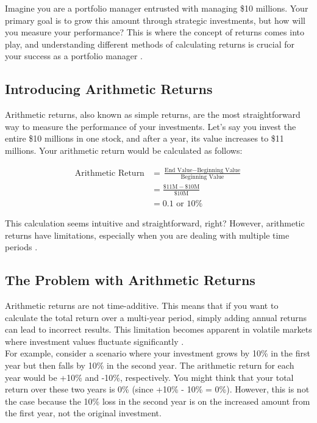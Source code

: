 \documentclass{article}
\begin{document}
Imagine you are a portfolio manager entrusted with managing \$10 millions. Your primary goal is to grow this amount through strategic investments, but how will you measure your performance? This is where the concept of returns comes into play, and understanding different methods of calculating returns is crucial for your success as a portfolio manager \cite{bodie2018investments}.

\subsection{Introducing Arithmetic Returns}

Arithmetic returns, also known as simple returns, are the most straightforward way to measure the performance of your investments. Let's say you invest the entire \$10 millions in one stock, and after a year, its value increases to \$11 millions. Your arithmetic return would be calculated as follows:

\begin{align*}
    \text{Arithmetic Return} &= \frac{\text{End Value} - \text{Beginning Value}}{\text{Beginning Value}} \\
                             &= \frac{\$11\text{M} - \$10\text{M}}{\$10\text{M}} \\
                             &= 0.1 \text{ or } 10\%
\end{align*}

This calculation seems intuitive and straightforward, right? However, arithmetic returns have limitations, especially when you are dealing with multiple time periods \cite{fabozzi2010foundations}.

\subsection{The Problem with Arithmetic Returns}

Arithmetic returns are not time-additive. This means that if you want to calculate the total return over a multi-year period, simply adding annual returns can lead to incorrect results. This limitation becomes apparent in volatile markets where investment values fluctuate significantly \cite{lo1988stock}. \\

For example, consider a scenario where your investment grows by 10\% in the first year but then falls by 10\% in the second year. The arithmetic return for each year would be +10\% and -10\%, respectively. You might think that your total return over these two years is 0\% (since +10\% - 10\% = 0\%). However, this is not the case because the 10\% loss in the second year is on the increased amount from the first year, not the original investment. \\
\end{document}
